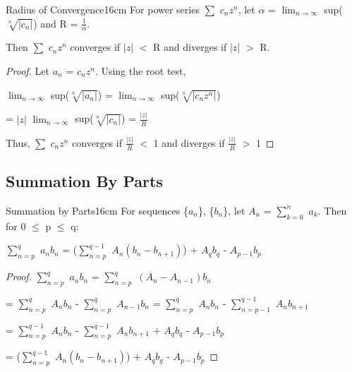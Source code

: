     \begin{wtheorem}{Radius of Convergence}{16cm}
        For power series $\sum$ $c_n z^n$, let
        $\alpha$ = $\lim_{n \rightarrow \infty}$ sup($\sqrt[n]{|c_n|}$)
        and R = $\frac{1}{\alpha}$.

        Then $\sum$ $c_n z^n$ converges if $|z|$ $<$ R and
        diverges if $|z|$ $>$ R.
    \end{wtheorem}

    \begin{proof}
        Let $a_n$ = $c_n z^n$. Using the {\color{red} root test},

        \hspace{1cm}
        $\lim_{n \rightarrow \infty}$ sup($\sqrt[n]{|a_n|}$)
        = $\lim_{n \rightarrow \infty}$ sup($\sqrt[n]{|c_n z^n|}$)

        \hspace{4.7cm}
        = $|z|$ $\lim_{n \rightarrow \infty}$ sup($\sqrt[n]{|c_n|}$)
        = $\frac{|z|}{R}$

        Thus, $\sum$ $c_n z^n$ converges if $\frac{|z|}{R}$ $<$ 1
        and diverges if $\frac{|z|}{R}$ $>$ 1
    \end{proof}

    \vspace{0.5cm}





\subsection{ Summation By Parts }

    \begin{wtheorem}{Summation by Parts}{16cm}
        For sequences \{$a_n$\}, \{$b_n$\}, let $A_n$ = $\sum_{k=0}^n$ $a_k$.
        Then for 0 $\leq$ p $\leq$ q:

        \hspace{0.5cm}
        $\sum_{n = p}^q$ $a_n b_n$
        = ($\sum_{n = p}^{q-1}$ $A_n (b_n - b_{n+1})$)
        + $A_q b_q$ - $A_{p-1} b_p$
    \end{wtheorem}

    \begin{proof}
        $\sum_{n = p}^q$ $a_n b_n$
        = $\sum_{n = p}^q$ $(A_n - A_{n-1}) b_n$

        \hspace{2cm}
        = $\sum_{n = p}^q$ $A_n b_n$ - $\sum_{n = p}^q$ $A_{n-1} b_n$
        = $\sum_{n = p}^q$ $A_n b_n$ - $\sum_{n = p-1}^{q-1}$ $A_{n} b_{n+1}$

        \hspace{2cm}
        = $\sum_{n = p}^{q-1}$ $A_n b_n$ - $\sum_{n = p}^{q-1}$ $A_{n} b_{n+1}$
        + $A_q b_q$ - $A_{p-1} b_p$

        \hspace{2cm}
        = ($\sum_{n = p}^{q-1}$ $A_n (b_n - b_{n+1})$)
        + $A_q b_q$ - $A_{p-1} b_p$
    \end{proof}

